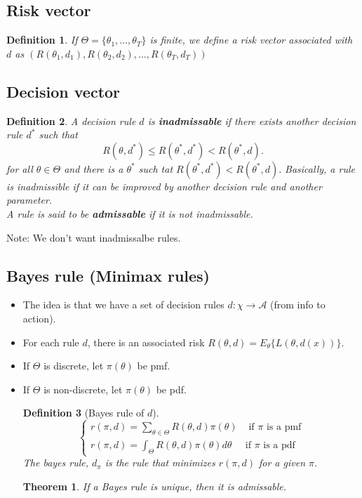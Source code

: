 \documentclass[12pt]{report} \addtolength{\textheight}{2in}
\newtheorem{defn}{Definition}
\newtheorem{thm}{Theorem}
\begin{document}
\subsection*{Risk vector}
\begin{defn}If $\Theta=\{\theta_1,\dots, \theta_T\}$ is finite, we define a risk vector associated with $d$ as $(R(\theta_1,d_1),R(\theta_2,d_2),\dots, R(\theta_T,d_T))$
\end{defn}
\subsection*{Decision vector}
\begin{defn}
A decision rule $d$ is \textbf{inadmissable} if there exists another decision rule $d^*$ such that
\begin{displaymath}
R(\theta, d^*) \leq R(\theta^*, d^*) < R(\theta^*,d).
\end{displaymath}
for all $\theta \in \Theta$ and there is a $\theta^*$ such tat $R(\theta^*, d^*) < R(\theta^*,d).$
Basically, a rule is inadmissible if it can be improved by another decision rule and another parameter.\\
A rule is said to be \textbf{admissable} if it is not inadmissable.
\end{defn}
Note: We don't want inadmissalbe rules.
\subsection*{Bayes rule (Minimax rules)}
\begin{itemize}
\item The idea is that we have a set of decision rules $d: \chi \to \mathcal {A}$ (from info to action). 
\item For each rule $d$, there is an associated risk $R(\theta,d)=E_{\theta} \{L(\theta, d(x))\}.$
\item If $\Theta$ is discrete, let $\pi(\theta)$ be pmf.
\item If $\Theta$ is non-discrete, let $\pi(\theta)$ be pdf.
\begin{defn}[Bayes rule of $d$]
\begin{displaymath}
\begin{cases}
r(\pi, d)=\sum_{\theta\in \Theta} R(\theta, d) \pi(\theta) & \text{ if $\pi$ is a pmf} \\
r(\pi, d)=\int_{ \Theta} R(\theta, d) \pi(\theta) d\theta & \text{if $\pi$ is a pdf}
\end{cases}
\end{displaymath}
The bayes rule, $d_\pi$ is the rule that minimizes $r(\pi,d)$ for a given $\pi.$
\end{defn} 
\begin{thm}
If a Bayes rule is unique, then it is admissable.
\end{thm}
\end{itemize}
\end{document}
